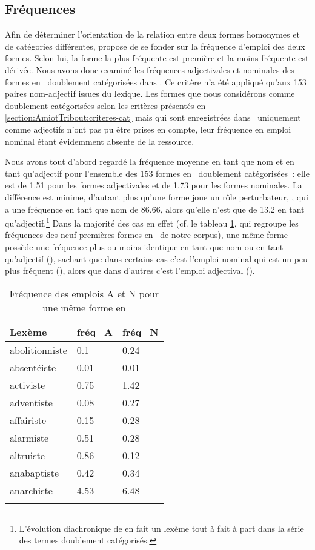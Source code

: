 \documentclass[output=paper]{LSP/langsci}
\begin{document}
\subsection{Fréquences} \label{section:AmiotTribout:frequences}
Afin de déterminer l'orientation de la relation entre deux formes homonymes et de catégories différentes,
 \cite{marchand64} propose de se fonder sur la fréquence d'emploi des deux formes. Selon lui, la forme la plus fréquente est première et  la moins fréquente est dérivée.
Nous avons donc examiné les fréquences adjectivales et nominales des formes en \iste\ doublement catégorisées dans \lexiq.
Ce critère n'a été appliqué qu'aux 153 paires nom-adjectif issues du lexique. Les formes que nous considérons comme doublement catégorisées selon les critères présentés en \ref{section:AmiotTribout:criteres-cat} mais qui sont enregistrées dans \lexiq\ uniquement  comme adjectifs n'ont pas pu être prises en compte, leur fréquence en emploi nominal étant évidemment absente de la ressource.

Nous avons tout d'abord regardé la fréquence moyenne en tant que nom et en tant qu'adjectif pour l'ensemble des 153 formes en \iste\ doublement catégorisées~: elle est de 1.51 pour les formes adjectivales et de 1.73 pour les formes nominales. La différence est minime, d'autant plus qu'une forme joue un rôle perturbateur, , qui a une fréquence en tant que nom de 86.66, alors qu'elle n'est que de 13.2 en tant qu'adjectif.\footnote{L'évolution diachronique de  en fait un lexème tout à fait à part dans la série des termes doublement catégorisés.}  Dans la majorité des cas en effet (cf. le tableau \ref{tab:AmiotTribout:freq}, qui regroupe les fréquences des neuf premières formes en \iste\ de notre corpus), une même forme possède une fréquence plus ou moins identique en tant que nom ou en tant qu'adjectif (), sachant que dans certains cas c'est l'emploi nominal qui est un peu plus fréquent (), alors que dans d'autres c'est l'emploi adjectival ().

\begin{table}
\caption{Fréquence des emplois A et N pour une même forme en \iste}
\label{tab:AmiotTribout:freq}
 \begin{tabular}{lll}
 \lsptoprule
 Lexème & fréq\_A & fréq\_N\\ %
  \midrule
abolitionniste  &  0.1 & 0.24 \\
absentéiste & 0.01 & 0.01\\
activiste & 0.75 & 1.42\\
adventiste & 0.08 & 0.27\\
affairiste & 0.15 & 0.28\\
alarmiste & 0.51 & 0.28\\
altruiste & 0.86 & 0.12\\
anabaptiste & 0.42 & 0.34\\
anarchiste & 4.53 & 6.48\\
  \lspbottomrule
 \end{tabular}
\end{table}
\end{document}
